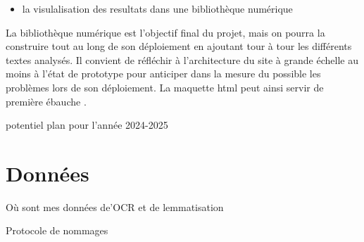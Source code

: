 \documentclass[11pt,french]{article}
\begin{document}
\begin{itemize}[label=$\bullet$]
    \item la visulalisation des resultats dans une bibliothèque numérique
\end{itemize}
La bibliothèque numérique est l'objectif final du projet, mais on pourra la construire tout au long de son déploiement en ajoutant tour à tour les différents textes analysés. Il convient de réfléchir à l'architecture du site à grande échelle au moins à l'état de prototype pour anticiper dans la mesure du possible les problèmes lors de son déploiement. La maquette html peut ainsi servir de première ébauche .

potentiel plan pour l'année 2024-2025

\FloatBarrier
\section{Données}
Où sont mes données de'OCR et de lemmatisation

Protocole de nommages 
\clearpage

    
\FloatBarrier
\clearpage

 
\end{document}

